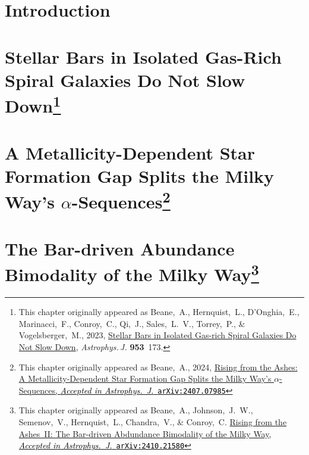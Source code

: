 \documentclass[11pt]{gsasthesis} %
\newcommand{\doi}[2]{\href{http://dx.doi.org/#1}{{#2}}}
\newcommand{\arxivaccept}[3]{\href{http://arxiv.org/abs/#1}{{#2}\textcolor{black}{, \textit{Accepted in #3}}\ \textcolor{black}{\texttt{arXiv:#1}}}}
\begin{document}

\chapter{Introduction}\label{ch:intro}


\chapter{Stellar Bars in Isolated Gas-Rich Spiral Galaxies Do Not Slow Down\footnote{This chapter originally appeared as Beane,~A., Hernquist,~L., D'Onghia,~E., Marinacci,~F., Conroy,~C., Qi,~J., 
Sales,~L.~V., Torrey,~P., \& Vogelsberger,~M., 2023, \doi{10.3847/1538-4357/ace2b9}{Stellar Bars in Isolated 
Gas-rich Spiral Galaxies Do Not Slow Down}, \textit{Astrophys.\,J.} \textbf{953}~173.}}\label{ch:gasbar}


\chapter{A Metallicity-Dependent Star Formation Gap Splits the Milky Way's \texorpdfstring{$\alpha$}{α}-Sequences\footnote{This chapter originally appeared as Beane,~A., 2024, \arxivaccept{2407.07985}{Rising from the Ashes: A Metallicity-Dependent Star Formation Gap Splits the Milky Way's $\alpha$-Sequences}{Astrophys.~J.}}}\label{ch:GSEgas}


\chapter{The Bar-driven Abundance Bimodality of the Milky Way\footnote{This chapter originally appeared as Beane,~A., Johnson,~J.~W., Semenov,~V., Hernquist,~L., Chandra,~V., \& Conroy,~C. \arxivaccept{2410.21580}{Rising from the Ashes~II: The Bar-driven Abdundance Bimodality of the Milky Way}{Astrophys.~J.}}}\label{ch:Mgdec}

\end{document}
